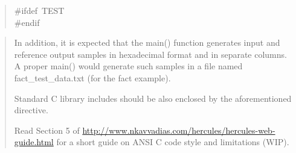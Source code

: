 \documentclass[a4paper]{article}
\begin{document}
%
\begin{quote}{\ttfamily \raggedright \noindent
\#ifdef~TEST\\
\#endif
}
\end{quote}
%
\begin{quote}
\setcounter{listcnt0}{0}
\begin{list}{.}
{
\addtocounter{listcnt0}{1}
\setlength{\rightmargin}{\leftmargin}
}

\item In addition, it is expected that the main() function generates input and
reference output samples in hexadecimal format and in separate columns. A proper
main() would generate such samples in a file named fact\_test\_data.txt (for the
fact example).

\item Standard C library includes should be also enclosed by the aforementioned
directive.

\item Read Section 5 of \url{http://www.nkavvadias.com/hercules/hercules-web-guide.html}
for a short guide on ANSI C code style and limitations (WIP).
\end{list}

\end{quote}
\setcounter{listcnt0}{0}
\end{document}
